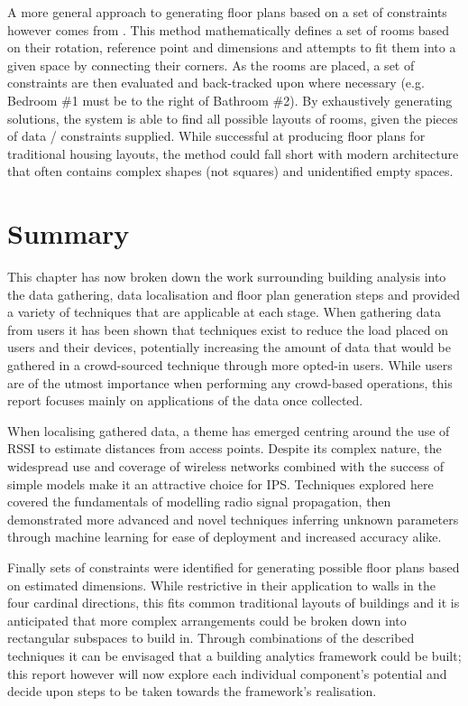 \documentclass{UoYCSproject}
\begin{document}
            A more general approach to generating floor plans based on a set of constraints however comes from \citet{charman1994constraint}. This method mathematically defines a set of rooms based on their rotation, reference point and dimensions and attempts to fit them into a given space by connecting their corners. As the rooms are placed, a set of constraints are then evaluated and back-tracked upon where necessary (e.g. Bedroom \#1 must be to the right of Bathroom \#2). By exhaustively generating solutions, the system is able to find all possible layouts of rooms, given the pieces of data / constraints supplied. While successful at producing floor plans for traditional housing layouts, the method could fall short with modern architecture that often contains complex shapes (not squares) and unidentified empty spaces.
            
        \section{Summary}
        \label{sec:relsum}
        
	        This chapter has now broken down the work surrounding building analysis into the data gathering, data localisation and floor plan generation steps and provided a variety of techniques that are applicable at each stage. When gathering data from users it has been shown that techniques exist to reduce the load placed on users and their devices, potentially increasing the amount of data that would be gathered in a crowd-sourced technique through more opted-in users. While users are of the utmost importance when performing any crowd-based operations, this report focuses mainly on applications of the data once collected.
            
            When localising gathered data, a theme has emerged centring around the use of RSSI to estimate distances from access points. Despite its complex nature, the  widespread use and coverage of wireless networks combined with the success of simple models make it an attractive choice for IPS. Techniques explored here covered the fundamentals of modelling radio signal propagation, then demonstrated more advanced and novel techniques inferring unknown parameters through machine learning for ease of deployment and increased accuracy alike.
            
            Finally sets of constraints were identified for generating possible floor plans based on estimated dimensions. While restrictive in their application to walls in the four cardinal directions, this fits common traditional layouts of buildings and it is anticipated that more complex arrangements could be broken down into rectangular subspaces to build in. Through combinations of the described techniques it can be envisaged that a building analytics framework could be built; this report however will now explore each individual component's potential and decide upon steps to be taken towards the framework's realisation.
\end{document}
